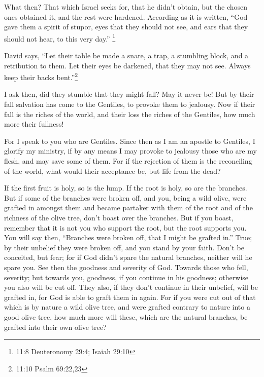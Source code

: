  What then? That which Israel seeks for, that he didn't
obtain, but the chosen ones obtained it, and the rest were hardened.
 According as it is written, ``God gave them a spirit of
stupor, eyes that they should not see, and ears that they should not
hear, to this very day.'' \footnote{11:8 Deuteronomy 29:4; Isaiah 29:10}

 David says, ``Let their table be made a snare, a trap, a
stumbling block, and a retribution to them.  Let their eyes
be darkened, that they may not see. Always keep their backs
bent.''\footnote{11:10 Psalm 69:22,23}

 I ask then, did they stumble that they might fall? May it
never be! But by their fall salvation has come to the Gentiles, to
provoke them to jealousy.  Now if their fall is the riches
of the world, and their loss the riches of the Gentiles, how much more
their fullness!

 For I speak to you who are Gentiles. Since then as I am an
apostle to Gentiles, I glorify my ministry,  if by any
means I may provoke to jealousy those who are my flesh, and may save
some of them.  For if the rejection of them is the
reconciling of the world, what would their acceptance be, but life from
the dead?

 If the first fruit is holy, so is the lump. If the root is
holy, so are the branches.  But if some of the branches
were broken off, and you, being a wild olive, were grafted in amongst
them and became partaker with them of the root and of the richness of
the olive tree,  don't boast over the branches. But if you
boast, remember that it is not you who support the root, but the root
supports you.  You will say then, ``Branches were broken
off, that I might be grafted in.''  True; by their unbelief
they were broken off, and you stand by your faith. Don't be conceited,
but fear;  for if God didn't spare the natural branches,
neither will he spare you.  See then the goodness and
severity of God. Towards those who fell, severity; but towards you,
goodness, if you continue in his goodness; otherwise you also will be
cut off.  They also, if they don't continue in their
unbelief, will be grafted in, for God is able to graft them in again.
 For if you were cut out of that which is by nature a wild
olive tree, and were grafted contrary to nature into a good olive tree,
how much more will these, which are the natural branches, be grafted
into their own olive tree?

